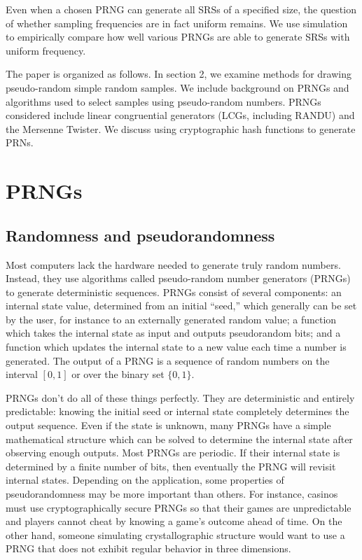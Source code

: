 \documentclass[12pt]{article}
\newcommand{\todo}[1]{{\color{red}{TO DO: \sc #1}}}
\begin{document}
Even when a chosen PRNG can generate all SRSs of a specified size, the question of whether sampling frequencies are in fact uniform remains.
We use simulation to empirically compare how well various PRNGs are able to generate SRSs with uniform frequency.
\todo{Empirically, we find that the hash function PRNG performs just as well or better than MT....}

The paper is organized as follows. 
In section 2, we examine methods for drawing pseudo-random simple random samples. 
We include background on PRNGs and algorithms used to select samples using pseudo-random numbers.
PRNGs considered include linear congruential generators (LCGs, including RANDU)
and the Mersenne Twister. We discuss using cryptographic hash functions to generate PRNs.
\todo{...}



\section{PRNGs}
\subsection{Randomness and pseudorandomness}
Most computers lack the hardware needed to generate truly random numbers. 
Instead, they use algorithms called pseudo-random number generators (PRNGs) to generate
deterministic sequences.
PRNGs consist of several components:
an internal state value, determined from an initial ``seed,'' which generally can be set by the user,
for instance to an externally generated random value;
a function which takes the internal state as input and outputs pseudorandom bits;
and a function which updates the internal state to a new value each time a number is generated.
The output of a PRNG is a sequence of random numbers on the interval $[0, 1]$ or over the binary set $\{0, 1\}$.

PRNGs don't do all of these things perfectly.
They are deterministic and entirely predictable: knowing the initial seed or internal state completely determines the output sequence.
Even if the state is unknown, many PRNGs have a simple mathematical structure which can be solved to determine the internal state after observing enough outputs.
Most PRNGs are periodic.
If their internal state is determined by a finite number of bits, then eventually the PRNG will revisit internal states.
Depending on the application, some properties of pseudorandomness may be more important than others.
For instance, casinos must use cryptographically secure PRNGs so that their games are unpredictable and players cannot cheat by knowing a game's outcome ahead of time.
On the other hand, someone simulating crystallographic structure would want to use a PRNG that does not exhibit regular behavior in three dimensions.
\end{document}
